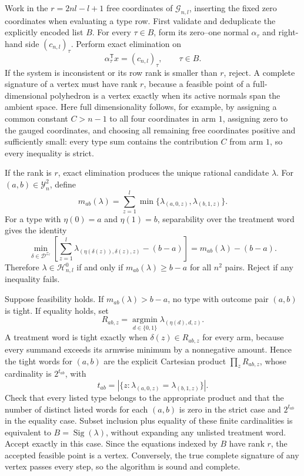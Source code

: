 Work in the \(r=2nl-l+1\) free coordinates of \(\mathcal G_{n,l}\), inserting the fixed zero coordinates when evaluating a type row. First validate and deduplicate the explicitly encoded list \(B\). For every \(\tau\in B\), form its zero--one normal \(\alpha_\tau\) and right-hand side \((c_{n,l})_\tau\). Perform exact elimination on
\[
\alpha_\tau^{\mathsf T}x=(c_{n,l})_\tau,\qquad \tau\in B.
\]
If the system is inconsistent or its row rank is smaller than \(r\), reject. A complete signature of a vertex must have rank \(r\), because a feasible point of a full-dimensional polyhedron is a vertex exactly when its active normals span the ambient space. Here full dimensionality follows, for example, by assigning a common constant \(C>n-1\) to all four coordinates in arm \(1\), assigning zero to the gauged coordinates, and choosing all remaining free coordinates positive and sufficiently small: every type sum contains the contribution \(C\) from arm \(1\), so every inequality is strict.

If the rank is \(r\), exact elimination produces the unique rational candidate \(\lambda\). For \((a,b)\in\mathcal Y_n^2\), define
\[
m_{ab}(\lambda)=\sum_{z=1}^l\min\{\lambda_{(a,0,z)},\lambda_{(b,1,z)}\}.
\]
For a type with \(\eta(0)=a\) and \(\eta(1)=b\), separability over the treatment word gives the identity
\[
\min_{\delta\in\mathcal D^{\mathcal Z_l}}\left[\sum_{z=1}^l\lambda_{(\eta(\delta(z)),\delta(z),z)}-(b-a)\right]=m_{ab}(\lambda)-(b-a).
\]
Therefore \(\lambda\in\mathcal H^0_{n,l}\) if and only if \(m_{ab}(\lambda)\ge b-a\) for all \(n^2\) pairs. Reject if any inequality fails.

Suppose feasibility holds. If \(m_{ab}(\lambda)>b-a\), no type with outcome pair \((a,b)\) is tight. If equality holds, set
\[
R_{ab,z}=\operatorname*{argmin}_{d\in\{0,1\}}\lambda_{(\eta(d),d,z)}.
\]
A treatment word is tight exactly when \(\delta(z)\in R_{ab,z}\) for every arm, because every summand exceeds its armwise minimum by a nonnegative amount. Hence the tight words for \((a,b)\) are the explicit Cartesian product \(\prod_z R_{ab,z}\), whose cardinality is \(2^{t_{ab}}\), with
\[
t_{ab}=|\{z:\lambda_{(a,0,z)}=\lambda_{(b,1,z)}\}|.
\]
Check that every listed type belongs to the appropriate product and that the number of distinct listed words for each \((a,b)\) is zero in the strict case and \(2^{t_{ab}}\) in the equality case. Subset inclusion plus equality of these finite cardinalities is equivalent to \(B=\operatorname{Sig}(\lambda)\), without expanding any unlisted treatment word. Accept exactly in this case. Since the equations indexed by \(B\) have rank \(r\), the accepted feasible point is a vertex. Conversely, the true complete signature of any vertex passes every step, so the algorithm is sound and complete.

